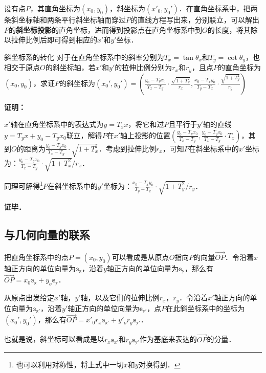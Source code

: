 设有点$P$，其直角坐标为$(x_0, y_0)$，斜坐标为$(x'_0, y_0')$．在直角坐标系中，把两条斜坐标轴和两条平行斜坐标轴而穿过$P$的直线方程写出来，分别联立，可以解出$P$的\textbf{斜坐标投影}的直角坐标，进而得到投影点在直角坐标系中到$O$的长度，将其除以拉伸比例后即可得到相应的$x'$和$y'$坐标．

\begin{example}{斜坐标系的转化}
对于在直角坐标系中的斜率分别为$T_x=\tan{\theta_x}$和$T_y=\cot{\theta_y}$，也相交于原点$O$的斜坐标轴，若$x'$和$y'$的拉伸比例分别为$r_x$和$r_y$，且点$P$的直角坐标为$(x_0, y_0)$，求证$P$的斜坐标为$(x_0', y_0')=(\frac{y_0-T_yx_0}{T_x-T_y}\cdot\frac{\sqrt{1+T_x^2}}{r_x}, \frac{x_0-T_xy_0}{T_y-T_x}\cdot\frac{\sqrt{1+T_y^2}}{r_y})$
\end{example}

\textbf{证明：}

$x'$轴在直角坐标系中的表达式为$y=T_xx$，将它和过$P$且平行于$y'$轴的直线$y=T_yx+y_0-T_yx_0$联立，解得$P$在$x'$轴上投影的位置$(\frac{y_0-T_yx_0}{T_x-T_y}, \frac{y_0-T_yx_0}{T_x-T_y}\cdot T_x)$，其到$O$的距离为$\frac{y_0-T_yx_0}{T_x-T_y}\cdot\sqrt{1+T_x^2}$．考虑到拉伸比例$r_x$，可知$P$在斜坐标系中的$x'$坐标为：$\frac{y_0-T_yx_0}{T_x-T_y}\cdot\sqrt{1+T_x^2}/r_x$．

同理可解得\footnote{也可以利用对称性，将上式中一切$x$和$y$对换得到．}$P$在斜坐标系中的$y'$坐标为：$\frac{x_0-T_xy_0}{T_y-T_x}\cdot\sqrt{1+T_y^2}/r_y$．

\textbf{证毕．}

\subsection{与几何向量的联系}

把直角坐标系中的点$P=(x_0, y_0)$可以看成是从原点$O$指向$P$的向量$\overrightarrow{OP}$．令沿着$x$轴正方向的单位向量为$\mathbb{e_x}$，沿着$y$轴正方向的单位向量为$\mathbb{e_y}$，那么有$\overrightarrow{OP}=x_0\mathbb{e_x}+y_o\mathbb{e_y}$．

从原点出发给定$x'$轴，$y'$轴，以及它们的拉伸比例$r_x$，$r_y$．令沿着$x'$轴正方向的单位向量为$\mathbb{e_{x'}}$，沿着$y'$轴正方向的单位向量为$\mathbb{e_{y'}}$，点$P$在此斜坐标系中的坐标为$(x_0',y_0')$，那么有$\overrightarrow{OP}=x'_0r_x\mathbb{e_{x'}}+y'_or_y\mathbb{e_{y'}}$．

也就是说，斜坐标可以看成是以$r_x\mathbb{e_{x'}}$和$r_y\mathbb{e_{y'}}$作为基底来表达的$\overrightarrow{OP}$的分量．




